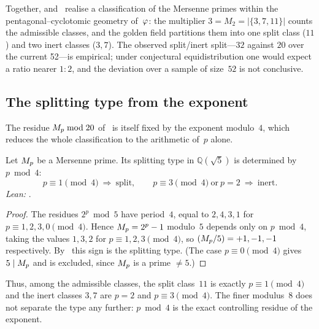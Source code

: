 \begin{Remark}\label{rem:classification}
Together,  and~
realise a classification of the Mersenne primes within the
pentagonal--cyclotomic geometry of~$\varphi$: the multiplier
$3=M_{2}=|\{3,7,11\}|$ counts the admissible classes, and the golden
field partitions them into one split class ($11$) and two inert classes
($3,7$).  The observed split/inert split---$32$ against $20$ over the
current 52---is empirical; under conjectural equidistribution one would
expect a ratio nearer $1:2$, and the deviation over a sample of size~$52$
is not conclusive.
\end{Remark}


\subsection{The splitting type from the exponent}
\label{ssec:fib-exponent}

The residue $M_{p}\bmod20$ of~ is itself fixed by the
exponent modulo~$4$, which reduces the whole classification to the
arithmetic of~$p$ alone.

\begin{Corollary}\label{cor:split-from-p}
Let $M_{p}$ be a Mersenne prime.  Its splitting type in $\mathbb{Q}(\sqrt5)$
is determined by $p\bmod4$:
\[
  p\equiv1\!\!\pmod4\ \Rightarrow\ \text{split},
  \qquad
  p\equiv3\!\!\pmod4\ \text{or}\ p=2\ \Rightarrow\ \text{inert}.
\]
  \emph{Lean:} .
\end{Corollary}

\begin{proof}
The residues $2^{p}\bmod5$ have period~$4$, equal to $2,4,3,1$ for
$p\equiv1,2,3,0\pmod4$.  Hence $M_{p}=2^{p}-1$ modulo~$5$ depends only on
$p\bmod4$, taking the values $1,3,2$ for $p\equiv1,2,3\pmod4$, so
$(M_{p}/5)=+1,-1,-1$ respectively.  By~ this sign is
the splitting type.  (The case $p\equiv0\pmod4$ gives $5\mid M_{p}$ and is
excluded, since $M_{p}$ is a prime $\neq5$.)
\end{proof}

Thus, among the admissible classes, the split class~$11$ is exactly
$p\equiv1\pmod4$ and the inert classes $3,7$ are $p=2$ and $p\equiv3\pmod4$.
The finer modulus~$8$ does not separate the type any further: $p\bmod4$ is
the exact controlling residue of the exponent.

